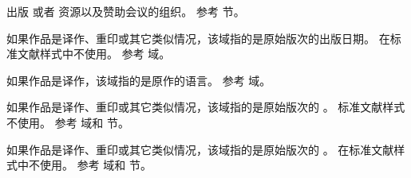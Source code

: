 \begin{fieldlist}



出版  或者   资源以及赞助会议的组织。
参考  节。




如果作品是译作、重印或其它类似情况，该域指的是原始版次的出版日期。
在标准文献样式中不使用。
参考  域。




如果作品是译作，该域指的是原作的语言。
参考  域。




如果作品是译作、重印或其它类似情况，该域指的是原始版次的 。
标准文献样式不使用。
参考  域和  节。




如果作品是译作、重印或其它类似情况，该域指的是原始版次的 。
在标准文献样式中不使用。
参考  域和  节。



\end{fieldlist}
